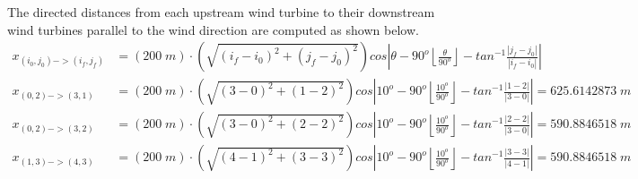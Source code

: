     The directed distances from each upstream wind turbine to their downstream wind turbines parallel to the wind direction are computed as shown below.
    \begin{align*}
        x_{(i_0,j_0)->(i_f,j_f)}
        &= (200\;m)\cdot\left(\sqrt{(i_f-i_0)^2+(j_f-j_0)^2}\right)cos\left|\theta-90^o\left \lfloor{\frac{\theta}{90^o}}\right \rfloor-tan^{-1}\frac{|j_f-j_0|}{|i_f-i_0|}\right| \\
        x_{(0,2)->(3,1)}
        &= (200\;m)\cdot\left(\sqrt{(3-0)^2+(1-2)^2}\right)cos\left|10^o-90^o\left \lfloor{\frac{10^o}{90^o}}\right \rfloor-tan^{-1}\frac{|1-2|}{|3-0|}\right| = 625.6142873\;m \\
        x_{(0,2)->(3,2)}
        &= (200\;m)\cdot\left(\sqrt{(3-0)^2+(2-2)^2}\right)cos\left|10^o-90^o\left \lfloor{\frac{10^o}{90^o}}\right \rfloor-tan^{-1}\frac{|2-2|}{|3-0|}\right| = 590.8846518\;m \\
        x_{(1,3)->(4,3)}
        &= (200\;m)\cdot\left(\sqrt{(4-1)^2+(3-3)^2}\right)cos\left|10^o-90^o\left \lfloor{\frac{10^o}{90^o}}\right \rfloor-tan^{-1}\frac{|3-3|}{|4-1|}\right| = 590.8846518\;m
    \end{align*}
    
